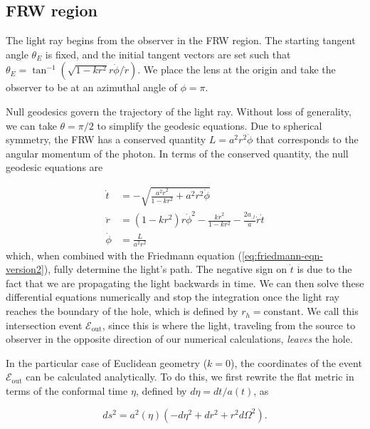 \subsection{FRW region}

The light ray begins from the observer in the FRW region. The starting tangent angle $\theta_E$ is fixed, and the initial tangent vectors are set such that $\theta_E = \tan^{-1}(\sqrt{1-kr^2}r\dot{\phi}/\dot{r})$. We place the lens at the origin and take the observer to be at an azimuthal angle of $\phi = \pi$. 

Null geodesics govern the trajectory of the light ray. Without loss of generality, we can take $\theta = \pi/2$ to simplify the geodesic equations. Due to spherical symmetry, the FRW has a conserved quantity $L = a^2 r^2 \dot{\phi}$ that corresponds to the angular momentum of the photon. In terms of the conserved quantity, the null geodesic equations are

\begin{subequations}
  \begin{align}
    \dot{t} &= -\sqrt{\frac{a^2\dot{r}^2}{1-kr^2} + a^2r^2 \dot{\phi}}\\
    \ddot{r}  &= (1-kr^2)r\dot{\phi}^2 - \frac{k\dot{r}^2}{1-kr^2} - \frac{2a_{,t}}{a}\dot{r}\dot{t}\\
    \dot{\phi} &= \frac{L}{a^2 r^2}
  \end{align}
  \label{eq:frw-null-geodesics}%
\end{subequations}
which, when combined with the Friedmann equation (\autoref{eq:friedmann-eqn-version2}), fully determine the light's path. The negative sign on $\dot{t}$ is due to the fact that we are propagating the light backwards in time. We can then solve these differential equations numerically and stop the integration once the light ray reaches the boundary of the hole, which is defined by $r_h = \text{constant}$. We call this intersection event $\mathcal{E}_{\text{out}}$, since this is where the light, traveling from the source to observer in the opposite direction of our numerical calculations, \emph{leaves} the hole. 

In the particular case of Euclidean geometry ($k = 0$), the coordinates of the event $\mathcal{E}_{\text{out}}$ can be calculated analytically. To do this, we first rewrite the flat metric in terms of the conformal time $\eta$, defined by $d\eta = dt/a(t)$, as

\begin{equation}
  ds^2 = a^2(\eta) \left ( -d \eta^2 + dr^2 + r^2 d \Omega^2 \right ).
  \label{eq:frw-metric-conformal-time}
\end{equation}

